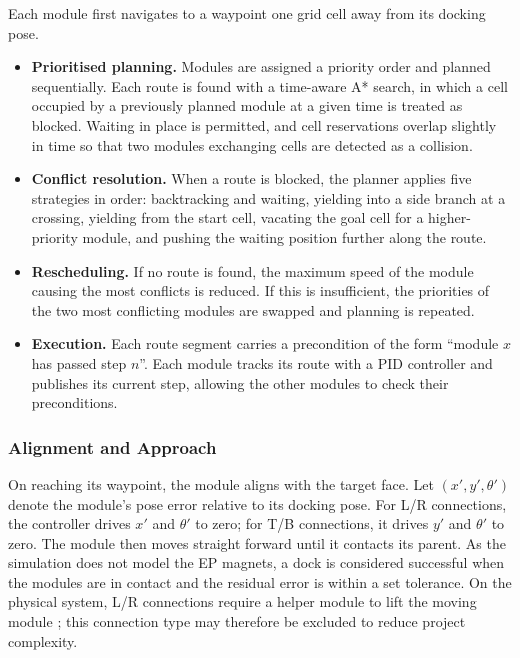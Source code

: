 \documentclass[12pt,a4paper]{article}
\begin{document}
Each module first navigates to a waypoint one grid cell away from its docking pose.

\begin{itemize}
\item \textbf{Prioritised planning.} Modules are assigned a priority order and planned sequentially. Each route is found with a time-aware A* search, in which a cell occupied by a previously planned module at a given time is treated as blocked. Waiting in place is permitted, and cell reservations overlap slightly in time so that two modules exchanging cells are detected as a collision.
\item \textbf{Conflict resolution.} When a route is blocked, the planner applies five strategies in order: backtracking and waiting, yielding into a side branch at a crossing, yielding from the start cell, vacating the goal cell for a higher-priority module, and pushing the waiting position further along the route.
\item \textbf{Rescheduling.} If no route is found, the maximum speed of the module causing the most conflicts is reduced. If this is insufficient, the priorities of the two most conflicting modules are swapped and planning is repeated.
\item \textbf{Execution.} Each route segment carries a precondition of the form ``module $x$ has passed step $n$''. Each module tracks its route with a PID controller and publishes its current step, allowing the other modules to check their preconditions.
\end{itemize}

\subsubsection{Alignment and Approach}
\label{sec:nav-dock}

On reaching its waypoint, the module aligns with the target face. Let $(x', y', \theta')$ denote the module's pose error relative to its docking pose. For L/R connections, the controller drives $x'$ and $\theta'$ to zero; for T/B connections, it drives $y'$ and $\theta'$ to zero. The module then moves straight forward until it contacts its parent. As the simulation does not model the EP magnets, a dock is considered successful when the modules are in contact and the residual error is within a set tolerance. On the physical system, L/R connections require a helper module to lift the moving module \cite{liu2023}; this connection type may therefore be excluded to reduce project complexity.
\end{document}

